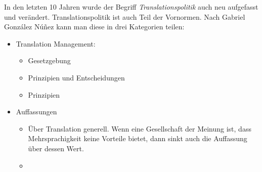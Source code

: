 \documentclass{article}
\begin{document}
	In den letzten 10 Jahren wurde der Begriff \textit{Translationspolitik} auch neu aufgefasst und verändert. Translationspolitik ist auch Teil der Vornormen. Nach Gabriel González Núñez kann man diese in drei Kategorien teilen:
	\begin{itemize}
		\item{Translation Management:}
		\begin{itemize}
			\item{Gesetzgebung}
			\item{Prinzipien und Entscheidungen}
			\item{Prinzipien}
		\end{itemize}
		\item{Auffassungen}
		\begin{itemize}
			\item{Über Translation generell. Wenn eine Gesellschaft der Meinung ist, dass Mehrsprachigkeit keine Vorteile bietet, dann sinkt auch die Auffassung über dessen Wert.}
			\item{}
		\end{itemize}
	\end{itemize}

	
	


	



	   
























	
\end{document}
